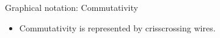 \documentclass[11pt]{beamer}
\begin{document}
\begin{frame}{Graphical notation: Commutativity} 

\begin{itemize}
\item Commutativity is represented by crisscrossing wires.
\end{itemize}

\begin{multicols}{2}
\begin{center}
\end{center}
\begin{center}
\end{center}
\end{multicols}

\vfill

\begin{multicols}{2}
\begin{center}
\end{center}
\begin{center}
\end{center}
\end{multicols}

\end{frame}
\end{document}
